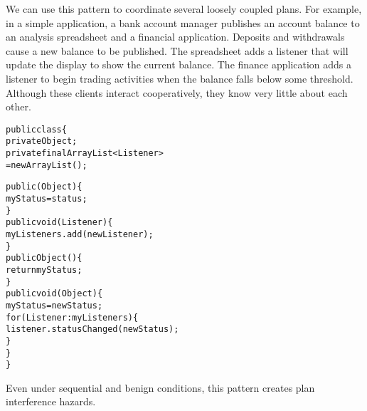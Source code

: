 \documentclass{llncs}
\begin{document}
We can use this pattern to coordinate several loosely coupled
plans. For example, in a simple application, a bank account manager
publishes an account balance to an analysis spreadsheet and a
financial application.  Deposits and withdrawals cause a new balance
to be published.  The spreadsheet adds a listener that will update the
display to show the current balance. The finance application adds a
listener to begin trading activities when the balance falls below some
threshold.  Although these clients interact cooperatively, they know
very little about each other.
%
\begin{alltt}
    public class  \{
        private Object ;
        private final ArrayList<Listener>  
                          = new ArrayList();

        public (Object ) \{
            myStatus = status;
        \}
        public void (Listener ) \{
            myListeners.add(newListener);
        \}
        public Object () \{
            return myStatus; 
        \}
        public void (Object ) \{
            myStatus = newStatus;
            for (Listener : myListeners) \{
                listener.statusChanged(newStatus);
            \}
        \}
    \}
\end{alltt}
%
Even under sequential and benign conditions, this pattern creates plan
interference hazards.
%
\end{document}
